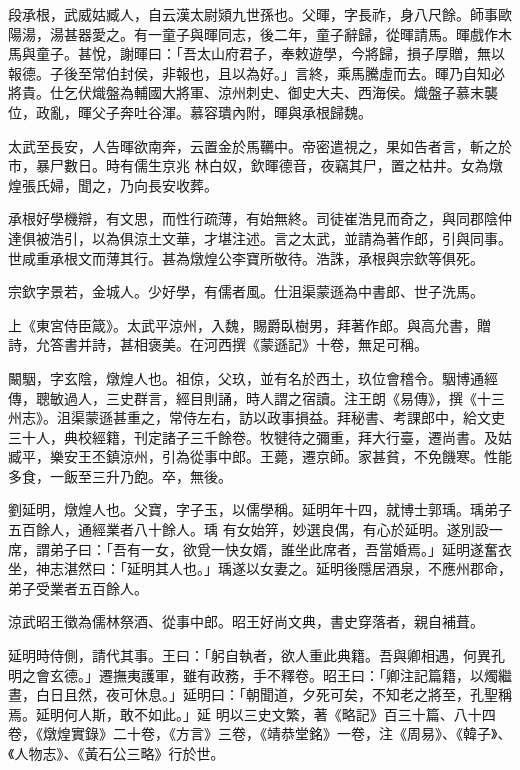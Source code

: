 \begin{pinyinscope}
 段承根，武威姑臧人，自云漢太尉熲九世孫也。父暉，字長祚，身八尺餘。師事歐陽湯，湯甚器愛之。有一童子與暉同志，後二年，童子辭歸，從暉請馬。暉戲作木馬與童子。甚悅，謝暉曰：「吾太山府君子，奉敕遊學，今將歸，損子厚贈，無以報德。子後至常伯封侯，非報也，且以為好。」言終，乘馬騰虛而去。暉乃自知必將貴。仕乞伏熾盤為輔國大將軍、涼州刺史、御史大夫、西海侯。熾盤子慕末襲位，政亂，暉父子奔吐谷渾。慕容璝內附，暉與承根歸魏。



 太武至長安，人告暉欲南奔，云置金於馬韉中。帝密遣視之，果如告者言，斬之於市，暴尸數日。時有儒生京兆
 林白奴，欽暉德音，夜竊其尸，置之枯井。女為燉煌張氏婦，聞之，乃向長安收葬。



 承根好學機辯，有文思，而性行疏薄，有始無終。司徒崔浩見而奇之，與同郡陰仲達俱被浩引，以為俱涼土文華，才堪注述。言之太武，並請為著作郎，引與同事。世咸重承根文而薄其行。甚為燉煌公李寶所敬待。浩誅，承根與宗欽等俱死。



 宗欽字景若，金城人。少好學，有儒者風。仕沮渠蒙遜為中書郎、世子洗馬。



 上《東宮侍臣箴》。太武平涼州，入魏，賜爵臥樹男，拜著作郎。與高允書，贈詩，允答書并詩，甚相褒美。在河西撰《蒙遜記》十卷，無足可稱。



 闞駰，字玄陰，燉煌人也。祖倞，父玖，並有名於西土，玖位會稽令。駰博通經傳，聰敏過人，三史群言，經目則誦，時人謂之宿讀。注王朗《易傳》，撰《十三州志》。沮渠蒙遜甚重之，常侍左右，訪以政事損益。拜秘書、考課郎中，給文吏三十人，典校經籍，刊定諸子三千餘卷。牧犍待之彌重，拜大行臺，遷尚書。及姑臧平，樂安王丕鎮涼州，引為從事中郎。王薨，遷京師。家甚貧，不免饑寒。性能多食，一飯至三升乃飽。卒，無後。



 劉延明，燉煌人也。父寶，字子玉，以儒學稱。延明年十四，就博士郭瑀。瑀弟子五百餘人，通經業者八十餘人。瑀
 有女始笄，妙選良偶，有心於延明。遂別設一席，謂弟子曰：「吾有一女，欲覓一快女婿，誰坐此席者，吾當婚焉。」延明遂奮衣坐，神志湛然曰：「延明其人也。」瑀遂以女妻之。延明後隱居酒泉，不應州郡命，弟子受業者五百餘人。



 涼武昭王徵為儒林祭酒、從事中郎。昭王好尚文典，書史穿落者，親自補葺。



 延明時侍側，請代其事。王曰：「躬自執者，欲人重此典籍。吾與卿相遇，何異孔明之會玄德。」遷撫夷護軍，雖有政務，手不釋卷。昭王曰：「卿注記篇籍，以燭繼晝，白日且然，夜可休息。」延明曰：「朝聞道，夕死可矣，不知老之將至，孔聖稱焉。延明何人斯，敢不如此。」延
 明以三史文繁，著《略記》百三十篇、八十四卷，《燉煌實錄》二十卷，《方言》三卷，《靖恭堂銘》一卷，注《周易》、《韓子》、《人物志》、《黃石公三略》行於世。




\end{pinyinscope}
